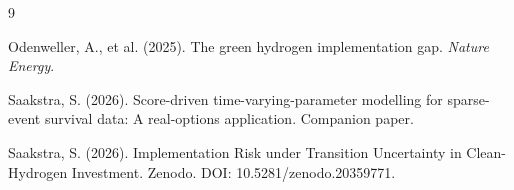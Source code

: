 \documentclass[11pt,a4paper]{article}
\begin{document}
\begin{thebibliography}{9}

Odenweller, A., et al. (2025). The green hydrogen implementation gap. \emph{Nature Energy}.

Saakstra, S. (2026). Score-driven time-varying-parameter modelling for sparse-event survival data: A real-options application. Companion paper.

Saakstra, S. (2026). Implementation Risk under Transition Uncertainty in Clean-Hydrogen Investment. Zenodo. DOI: 10.5281/zenodo.20359771.

\end{thebibliography}
\end{document}
